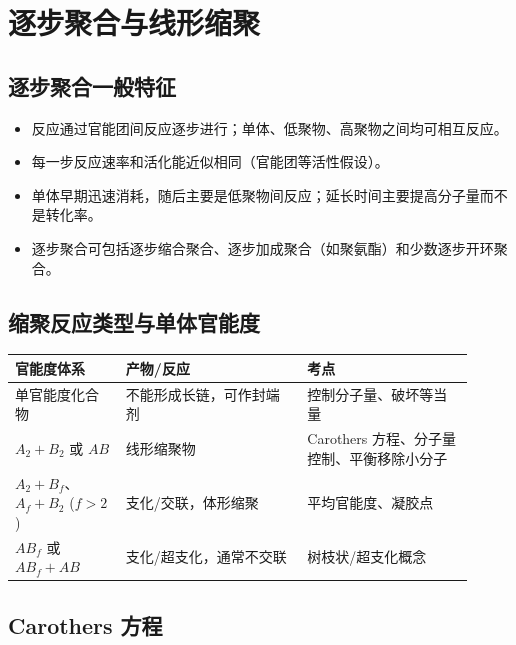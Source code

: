 \documentclass[UTF8,a4paper,10pt,twocolumn]{ctexart}
\begin{document}
\section{逐步聚合与线形缩聚}
\subsection{逐步聚合一般特征}
\begin{itemize}
  \item 反应通过官能团间反应逐步进行；单体、低聚物、高聚物之间均可相互反应。
  \item 每一步反应速率和活化能近似相同（官能团等活性假设）。
  \item 单体早期迅速消耗，随后主要是低聚物间反应；延长时间主要提高分子量而不是转化率。
  \item 逐步聚合可包括逐步缩合聚合、逐步加成聚合（如聚氨酯）和少数逐步开环聚合。
\end{itemize}

\subsection{缩聚反应类型与单体官能度}
\begin{center}
  \scriptsize
  \begin{tabularx}{\linewidth}{p{0.22\linewidth}p{0.36\linewidth}p{0.33\linewidth}}
    \toprule
    官能度体系                       & 产物/反应        & 考点                         \\
    \midrule
    单官能度化合物                     & 不能形成长链，可作封端剂 & 控制分子量、破坏等当量                \\
    $A_2+B_2$ 或 $AB$            & 线形缩聚物        & Carothers 方程、分子量控制、平衡移除小分子 \\
    $A_2+B_f$、$A_f+B_2$ ($f>2$) & 支化/交联，体形缩聚   & 平均官能度、凝胶点                  \\
    $AB_f$ 或 $AB_f+AB$          & 支化/超支化，通常不交联 & 树枝状/超支化概念                  \\
    \bottomrule
  \end{tabularx}
\end{center}

\subsection{Carothers 方程}
\end{document}
